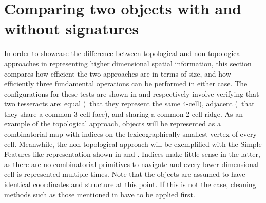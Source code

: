 \section{Comparing two objects with and without signatures}
\label{se:ndqueries}

In order to showcase the difference between topological and non-topological approaches in representing higher dimensional spatial information, this section compares how efficient the two approaches are in terms of size, and how efficiently three fundamental operations can be performed in either case.
The configurations for these tests are shown in  and respectively involve verifying that two tesseracts are: equal (\ie\ that they represent the same 4-cell), adjacent (\ie\ that they share a common 3-cell face), and sharing a common 2-cell ridge.
As an example of the topological approach, objects will be represented as a combinatorial map with indices on the lexicographically smallest vertex of every cell.
Meanwhile, the non-topological approach will be exemplified with the Simple Features-like \citep{SimpleFeatures1} representation shown in  and .
Indices make little sense in the latter, as there are no combinatorial primitives to navigate and every lower-dimensional cell is represented multiple times.
Note that the objects are assumed to have identical coordinates and structure at this point.
If this is not the case, cleaning methods such as those mentioned in  have to be applied first.

